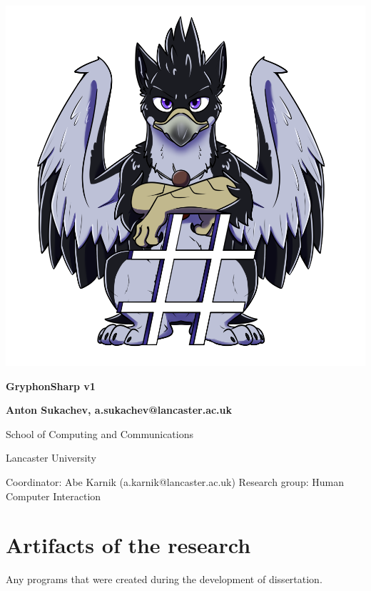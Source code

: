 \documentclass{article}
\begin{document}
\begin{titlepage}

    \center

    \includegraphics[scale=0.5]{AzuGryphonSharp.png} %

    \huge  \textbf{GryphonSharp v1}

    \vspace{2cm}

    \Large \textbf{Anton Sukachev, a.sukachev@lancaster.ac.uk}

    School of Computing and Communications

    Lancaster University

    \vfill

    Coordinator: Abe Karnik (a.karnik@lancaster.ac.uk)\endgraf
    Research group: Human Computer Interaction

\end{titlepage}
\pagebreak

\tableofcontents
\pagebreak



\section{Artifacts of the research}
Any programs that were created during the development of dissertation.
\end{document}
